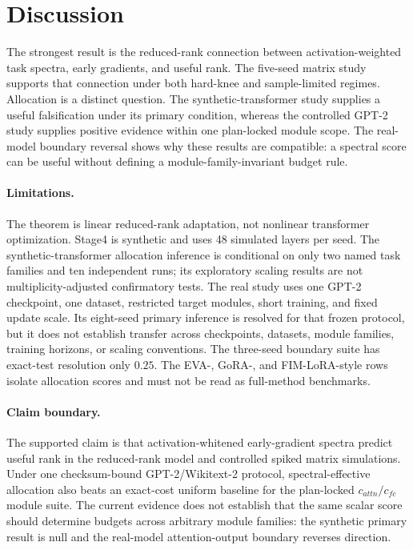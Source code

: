 \documentclass[10pt,twocolumn]{article}
\theoremstyle{definition}
\begin{document}
\section{Discussion}
\label{sec:discussion}

The strongest result is the reduced-rank connection between activation-weighted task spectra, early gradients, and useful rank.  The five-seed matrix study supports that connection under both hard-knee and sample-limited regimes.  Allocation is a distinct question.  The synthetic-transformer study supplies a useful falsification under its primary condition, whereas the controlled GPT-2 study supplies positive evidence within one plan-locked module scope.  The real-model boundary reversal shows why these results are compatible: a spectral score can be useful without defining a module-family-invariant budget rule.

\paragraph{Limitations.}
The theorem is linear reduced-rank adaptation, not nonlinear transformer optimization.  Stage4 is synthetic and uses 48 simulated layers per seed.  The synthetic-transformer allocation inference is conditional on only two named task families and ten independent runs; its exploratory scaling results are not multiplicity-adjusted confirmatory tests.  The real study uses one GPT-2 checkpoint, one dataset, restricted target modules, short training, and fixed update scale.  Its eight-seed primary inference is resolved for that frozen protocol, but it does not establish transfer across checkpoints, datasets, module families, training horizons, or scaling conventions.  The three-seed boundary suite has exact-test resolution only $0.25$.  The EVA-, GoRA-, and FIM-LoRA-style rows isolate allocation scores and must not be read as full-method benchmarks.

\paragraph{Claim boundary.}
The supported claim is that activation-whitened early-gradient spectra predict useful rank in the reduced-rank model and controlled spiked matrix simulations.  Under one checksum-bound GPT-2/Wikitext-2 protocol, spectral-effective allocation also beats an exact-cost uniform baseline for the plan-locked $c_{attn}/c_{fc}$ module suite.  The current evidence does not establish that the same scalar score should determine budgets across arbitrary module families: the synthetic primary result is null and the real-model attention-output boundary reverses direction.
\end{document}
